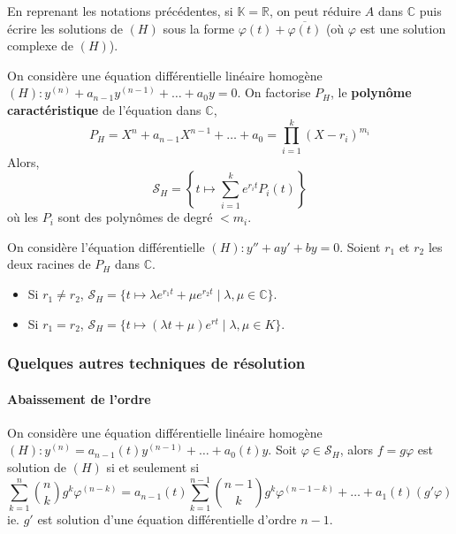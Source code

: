 	\begin{remark}
		En reprenant les notations précédentes, si $\mathbb{K} = \mathbb{R}$, on peut réduire $A$ dans $\mathbb{C}$ puis écrire les solutions de $(H)$ sous la forme $\varphi(t) + \overline{\varphi(t)}$ (où $\varphi$ est une solution complexe de $(H)$).
	\end{remark}

	\begin{corollary}
		On considère une équation différentielle linéaire homogène $(H) : y^{(n)} + a_{n-1} y^{(n-1)} + \dots + a_0 y = 0$. On factorise $P_H$, le \textbf{polynôme caractéristique} de l'équation dans $\mathbb{C}$,
		\[ P_H = X^n + a_{n-1}X^{n-1} + \dots + a_0 = \prod_{i=1}^k (X-r_i)^{m_i} \]
		Alors,
		\[ \mathcal{S}_H = \left\{t \mapsto \sum_{i=1}^k e^{r_i t} P_i(t)\right\} \]
		où les $P_i$ sont des polynômes de degré $< m_i$.
	\end{corollary}

	\begin{example}
		On considère l'équation différentielle $(H) : y'' + ay' + by = 0$. Soient $r_1$ et $r_2$ les deux racines de $P_H$ dans $\mathbb{C}$.
		\begin{itemize}
			\item Si $r_1 \neq r_2$, $\mathcal{S}_H = \{t \mapsto \lambda e^{r_1 t} + \mu e^{r_2 t} \mid \lambda, \mu \in \mathbb{C}\}$.
			\item Si $r_1 = r_2$, $\mathcal{S}_H = \{t \mapsto (\lambda t + \mu) e^{r t} \mid \lambda, \mu \in K\}$.
		\end{itemize}
	\end{example}

	\subsubsection{Quelques autres techniques de résolution}

	\paragraph{Abaissement de l'ordre}

	\begin{proposition}
		On considère une équation différentielle linéaire homogène $(H) : y^{(n)} = a_{n-1}(t) y^{(n-1)} + \dots + a_0(t) y$. Soit $\varphi \in \mathcal{S}_H$, alors $f = g \varphi$ est solution de $(H)$ si et seulement si
		\[ \sum_{k=1}^n \binom{n}{k} g^{k} \varphi^{(n-k)} = a_{n-1}(t) \sum_{k=1}^{n-1} \binom{n-1}{k} g^{k} \varphi^{(n-1-k)} + \dots + a_1(t) (g' \varphi) \]
		ie. $g'$ est solution d'une équation différentielle d'ordre $n-1$.
	\end{proposition}

